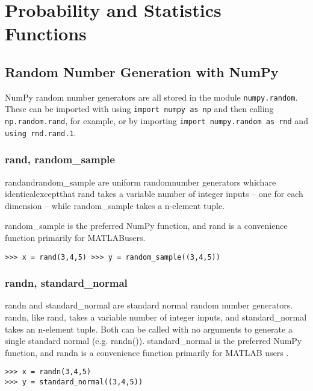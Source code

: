 \documentclass[KSmain.tex]{subfiles}
\begin{document}
 
\section{Probability and Statistics Functions}
\subsection{Random Number Generation with NumPy}
NumPy random number generators are all stored in the module \texttt{numpy.random}. 
These can be imported with using \texttt{import numpy as np} and then calling \texttt{np.random.rand}, for example, or 
by importing \texttt{import numpy.random as rnd} and \texttt{using rnd.rand.1}.
\subsubsection{rand, random\_sample}
randandrandom\_sample are uniform randomnumber generators whichare
 identicalexceptthat rand takes a variable number 
of integer inputs – one for each dimension – while random\_sample takes a n-element tuple. 

random\_sample is the preferred NumPy function, and rand is a convenience function primarily for MATLABusers.
\begin{framed}
\begin{verbatim}
>>> x = rand(3,4,5) >>> y = random_sample((3,4,5))
\end{verbatim}
\end{framed}


\subsubsection{randn, standard\_normal}
randn and standard\_normal are standard normal random number generators. randn, like rand, takes a
variable number of integer inputs, and standard\_normal takes an n-element tuple. Both can be called
with no arguments to generate a single standard normal (e.g. randn()). standard\_normal is the preferred
NumPy function, and randn is a convenience function primarily for MATLAB users .
\begin{framed}
\begin{verbatim}
>>> x = randn(3,4,5)
>>> y = standard_normal((3,4,5))
\end{verbatim}
\end{framed}
\end{document}

